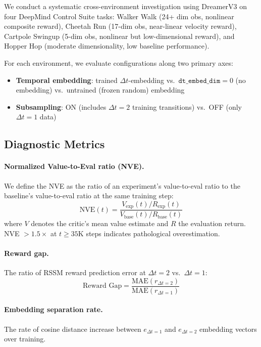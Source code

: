 \documentclass[letterpaper]{article}
\begin{document}
We conduct a systematic cross-environment investigation using DreamerV3 on four DeepMind Control Suite tasks: Walker Walk (24+ dim obs, nonlinear composite reward), Cheetah Run (17-dim obs, near-linear velocity reward), Cartpole Swingup (5-dim obs, nonlinear but low-dimensional reward), and Hopper Hop (moderate dimensionality, low baseline performance).

For each environment, we evaluate configurations along two primary axes:
\begin{itemize}
    \item \textbf{Temporal embedding}: trained $\Delta t$-embedding vs.\ $\texttt{dt\_embed\_dim}=0$ (no embedding) vs.\ untrained (frozen random) embedding
    \item \textbf{Subsampling}: ON (includes $\Delta t=2$ training transitions) vs.\ OFF (only $\Delta t=1$ data)
\end{itemize}

\subsection{Diagnostic Metrics}

\paragraph{Normalized Value-to-Eval ratio (NVE).} We define the NVE as the ratio of an experiment's value-to-eval ratio to the baseline's value-to-eval ratio at the same training step:
\begin{equation}
    \text{NVE}(t) = \frac{V_{\text{exp}}(t) / R_{\text{exp}}(t)}{V_{\text{base}}(t) / R_{\text{base}}(t)}
\end{equation}
where $V$ denotes the critic's mean value estimate and $R$ the evaluation return. NVE $> 1.5\times$ at $t \geq 35$K steps indicates pathological overestimation.

\paragraph{Reward gap.} The ratio of RSSM reward prediction error at $\Delta t=2$ vs.\ $\Delta t=1$:
\begin{equation}
    \text{Reward\ Gap} = \frac{\text{MAE}(r_{\Delta t=2})}{\text{MAE}(r_{\Delta t=1})}
\end{equation}

\paragraph{Embedding separation rate.} The rate of cosine distance increase between $e_{\Delta t=1}$ and $e_{\Delta t=2}$ embedding vectors over training.
\end{document}
